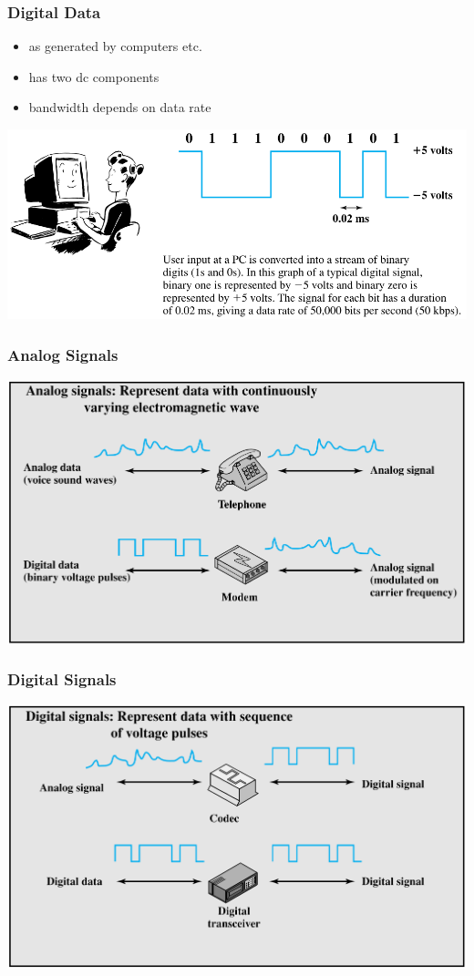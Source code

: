 \documentclass[pdflatex,compress]{beamer}
\begin{document}
\begin{frame}
	\frametitle{Digital Data}
	\begin{itemize}
		\item as generated by computers etc.
		\item has two dc components
		\item bandwidth depends on data rate
	\end{itemize}
	\begin{center}
		\includegraphics[width=\linewidth]{img/img08}
	\end{center}
\end{frame}

\begin{frame}
	\frametitle{Analog Signals}
	\begin{center}
		\includegraphics[width=\linewidth]{img/img09}
	\end{center}
\end{frame}

\begin{frame}
	\frametitle{Digital Signals}
	\begin{center}
		\includegraphics[width=\linewidth]{img/img10}
	\end{center}
\end{frame}
\end{document}
